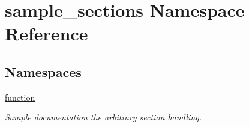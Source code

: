 \hypertarget{namespacesample__sections}{\section{sample\-\_\-sections Namespace Reference}
\label{namespacesample__sections}
}
\subsection*{Namespaces}
\begin{DoxyCompactItemize}
\item 
\hyperlink{namespacesample__sections_1_1function}{function}
\begin{DoxyCompactList}\small\item\em Sample documentation the arbitrary section handling. \end{DoxyCompactList}\end{DoxyCompactItemize}
